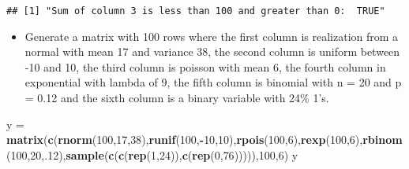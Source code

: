 \documentclass[]{article}
\newenvironment{Shaded}{\begin{snugshade}}{\end{snugshade}}
\newcommand{\KeywordTok}[1]{\textcolor[rgb]{0.13,0.29,0.53}{\textbf{#1}}}
\newcommand{\DecValTok}[1]{\textcolor[rgb]{0.00,0.00,0.81}{#1}}
\newcommand{\StringTok}[1]{\textcolor[rgb]{0.31,0.60,0.02}{#1}}
\newcommand{\OperatorTok}[1]{\textcolor[rgb]{0.81,0.36,0.00}{\textbf{#1}}}
\newcommand{\NormalTok}[1]{#1}
\providecommand{\tightlist}{%
  \setlength{\itemsep}{0pt}\setlength{\parskip}{0pt}}
\begin{document}
\begin{verbatim}
## [1] "Sum of column 3 is less than 100 and greater than 0:  TRUE"
\end{verbatim}

\begin{itemize}
\tightlist
\item
  Generate a matrix with 100 rows where the first column is realization
  from a normal with mean 17 and variance 38, the second column is
  uniform between -10 and 10, the third column is poisson with mean 6,
  the fourth column in exponential with lambda of 9, the fifth column is
  binomial with n = 20 and p = 0.12 and the sixth column is a binary
  variable with 24\% 1's.
\end{itemize}

\begin{Shaded}
\begin{Highlighting}[]
\NormalTok{y =}\StringTok{ }\KeywordTok{matrix}\NormalTok{(}\KeywordTok{c}\NormalTok{(}\KeywordTok{rnorm}\NormalTok{(}\DecValTok{100}\NormalTok{,}\DecValTok{17}\NormalTok{,}\DecValTok{38}\NormalTok{),}\KeywordTok{runif}\NormalTok{(}\DecValTok{100}\NormalTok{,}\OperatorTok{-}\DecValTok{10}\NormalTok{,}\DecValTok{10}\NormalTok{),}\KeywordTok{rpois}\NormalTok{(}\DecValTok{100}\NormalTok{,}\DecValTok{6}\NormalTok{),}\KeywordTok{rexp}\NormalTok{(}\DecValTok{100}\NormalTok{,}\DecValTok{6}\NormalTok{),}\KeywordTok{rbinom}\NormalTok{(}\DecValTok{100}\NormalTok{,}\DecValTok{20}\NormalTok{,.}\DecValTok{12}\NormalTok{),}\KeywordTok{sample}\NormalTok{(}\KeywordTok{c}\NormalTok{(}\KeywordTok{c}\NormalTok{(}\KeywordTok{rep}\NormalTok{(}\DecValTok{1}\NormalTok{,}\DecValTok{24}\NormalTok{)),}\KeywordTok{c}\NormalTok{(}\KeywordTok{rep}\NormalTok{(}\DecValTok{0}\NormalTok{,}\DecValTok{76}\NormalTok{))))),}\DecValTok{100}\NormalTok{,}\DecValTok{6}\NormalTok{)}
\NormalTok{y}
\end{Highlighting}
\end{Shaded}
\end{document}
